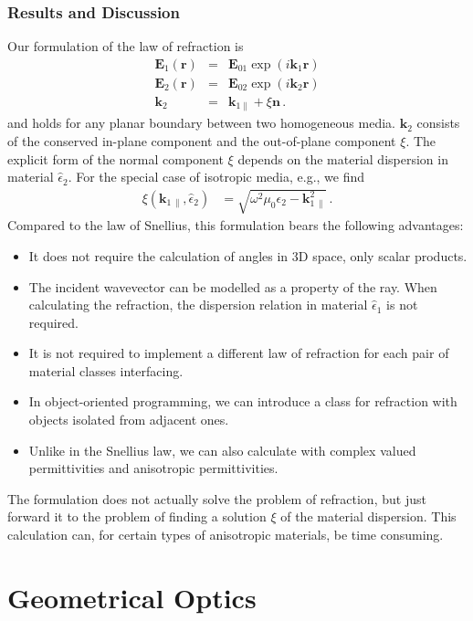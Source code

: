 \documentclass[12pt,a4paper,twoside,openright,BCOR10mm,headsepline,titlepage,abstracton,chapterprefix,final]{scrreprt}
\newcommand\Vector[1]{{\mathbf{#1}}}
\newcommand\Location{\Vector{r}}
\newcommand\wavenumber{k}
\newcommand\Wavevector{\Vector{\wavenumber}}
\newcommand\Tensor[1]{\hat{#1}}
\newcommand\scalarEfield{E}
\newcommand\Efield{\Vector{\scalarEfield}}
\newcommand\permittivity{\Tensor{\epsilon}}
\begin{document}
\subsection{Results and Discussion}
Our formulation of the law of refraction is
\begin{eqnarray}
 \Efield_1(\Location) &=& \Efield_{01} \exp(i \Wavevector_1 \Location) \\
 \Efield_2(\Location) &=& \Efield_{02} \exp(i \Wavevector_2 \Location) \\
 \Wavevector_{2} &=& \Wavevector_{1\parallel} + \xi \Vector{n}\,.\label{eq:xieqn}
\end{eqnarray}
and holds for any planar boundary between two homogeneous media. $\Vector{k}_2$ consists of the
conserved in-plane component and the out-of-plane component $\xi$. The explicit form of the normal component $\xi$ depends on
the material dispersion in material $\permittivity_2$. For the special case of isotropic media, e.g.,
we find 
\begin{align}
 \xi(\Vector{k}_{1\,\parallel},\permittivity_2) &= \sqrt{\omega^2 \mu_0 \epsilon_2 - \Vector{k}_{1\,\parallel}^2}\,.
\end{align}
Compared to the law of Snellius, this formulation bears the following advantages:
\begin{itemize}
 \item It does not require the calculation of angles in 3D space, only scalar products.
 \item The incident wavevector can be modelled as a property of the ray. When calculating the refraction, 
       the dispersion relation in material $\permittivity_1$ is not required.
 \item It is not required to implement a different law of refraction for each pair of material classes interfacing.
 \item In object-oriented programming, we can introduce a class for refraction with objects isolated from adjacent ones.
 \item Unlike in the Snellius law, we can also calculate with complex valued permittivities and anisotropic permittivities.
\end{itemize}
The formulation does not actually solve the problem of refraction, but just forward it to the problem of finding a solution $\xi$ of the material dispersion. 
This calculation can, for certain types of anisotropic materials, be time consuming.

\chapter{Geometrical Optics}
\end{document}
